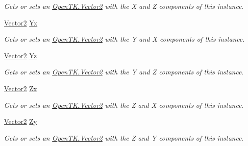 \begin{DoxyCompactItemize}
\begin{DoxyCompactList}\small\item\em Gets or sets an \hyperlink{struct_open_t_k_1_1_vector2}{Open\-T\-K.\-Vector2} with the X and Z components of this instance. \end{DoxyCompactList}\item 
\hyperlink{struct_open_t_k_1_1_vector2}{Vector2} \hyperlink{struct_open_t_k_1_1_vector3_a0df25fa1e9d3714bc65f43efd8cf574e}{Yx}
\begin{DoxyCompactList}\small\item\em Gets or sets an \hyperlink{struct_open_t_k_1_1_vector2}{Open\-T\-K.\-Vector2} with the Y and X components of this instance. \end{DoxyCompactList}\item 
\hyperlink{struct_open_t_k_1_1_vector2}{Vector2} \hyperlink{struct_open_t_k_1_1_vector3_a9aa986e42b6d765d154325bf7a81bf84}{Yz}
\begin{DoxyCompactList}\small\item\em Gets or sets an \hyperlink{struct_open_t_k_1_1_vector2}{Open\-T\-K.\-Vector2} with the Y and Z components of this instance. \end{DoxyCompactList}\item 
\hyperlink{struct_open_t_k_1_1_vector2}{Vector2} \hyperlink{struct_open_t_k_1_1_vector3_aed5a7595e31e263f5fc64397af2ebf74}{Zx}
\begin{DoxyCompactList}\small\item\em Gets or sets an \hyperlink{struct_open_t_k_1_1_vector2}{Open\-T\-K.\-Vector2} with the Z and X components of this instance. \end{DoxyCompactList}\item 
\hyperlink{struct_open_t_k_1_1_vector2}{Vector2} \hyperlink{struct_open_t_k_1_1_vector3_a8ec9f31766bde650eddd5a617f0758a9}{Zy}
\begin{DoxyCompactList}\small\item\em Gets or sets an \hyperlink{struct_open_t_k_1_1_vector2}{Open\-T\-K.\-Vector2} with the Z and Y components of this instance. \end{DoxyCompactList}\item 

\end{DoxyCompactItemize}
